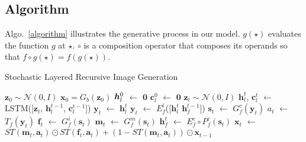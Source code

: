 \documentclass{article} \usepackage{iclr2017_conference,times}
\newcommand*\Let[2]{\State #1 $\gets$ #2}
\begin{document}
\subsection{Algorithm}
\label{Appendix_Alg}
Algo.~\ref{algorithm} illustrates the generative process in our model. $g(\star)$ evaluates the function $g$ at $\star$.  $\circ$ is a composition operator that composes its operands so that $f \circ g(\star) = f(g(\star))$. 

\begin{algorithm}
\caption{Stochastic Layered Recursive Image Generation}
\begin{algorithmic}[1]
\State $\bm{z}_0 \sim \mathcal{N}(0,I)$
\State  $\bm{x}_0 = G_b(\bm{z}_0)$  
\Let{$\hm{h}_l^0$}{$\bm{0}$}
\Let{$\bm{c}_l^0$}{$\bm{0}$}
\State $\bm{z}_t \sim \mathcal{N}(0,I)$
\Let{$\bm{h}_l^t$, $\bm{c}_l^t$}{LSTM([$\bm{z}_t$, $\bm{h}_l^{t-1}$, $\bm{c}_l^{t-1}$])}  
   \Let{$\bm{y}_t$}{$\bm{h}_l^t$}
  \Else
    \Let{$\bm{y}_t$}{$E_f^l$([$\bm{h}_l^t$  $\bm{h}^{{t-1}}_{f}$])} 
 \EndIf
   \Let{$\bm{s}_t$}{ $G_f^{c} (\bm{y}_t)$} 
           \Let{$a_t$}{$T_f(\bm{y}_t)$} 
     \Let{$\bm{f}_t$}{ $G_f^{i}  (\bm{s}_t)$} 
        \Let{$\bm{m}_t$}{ $G_f^{m}  (\bm{s}_t)$} 
        \Let{ $\bm{h}^{t}_{f}$}{ $E_f^{c}\circ P_f^c (\bm{s}_t)$} 
        \Let{$\bm{x}_t$}{$ST(\bm{m}_t,\bm{a}_t) \odot ST(\bm{f}_t,\bm{a}_t) + (1- ST(\bm{m}_t,\bm{a}_t)) \odot \bm{x}_{t-1}$}
\EndFor
\end{algorithmic}
\label{algorithm}
\end{algorithm}
\end{document}
